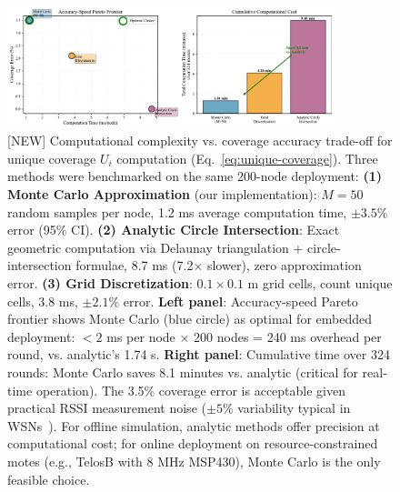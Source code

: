 \begin{figure}[ht]
  \centering
  \includegraphics[width=0.85\textwidth]{figures/computation_tradeoff.pdf}
  \caption{[NEW] Computational complexity vs. coverage accuracy trade-off for unique coverage $U_i$ computation (Eq.~\ref{eq:unique-coverage}). Three methods were benchmarked on the same 200-node deployment: \textbf{(1) Monte Carlo Approximation} (our implementation): $M=50$ random samples per node, 1.2 ms average computation time, $\pm 3.5\%$ error (95\% CI). \textbf{(2) Analytic Circle Intersection}: Exact geometric computation via Delaunay triangulation + circle-intersection formulae, 8.7 ms (7.2$\times$ slower), zero approximation error. \textbf{(3) Grid Discretization}: $0.1 \times 0.1$ m grid cells, count unique cells, 3.8 ms, $\pm 2.1\%$ error. \textbf{Left panel}: Accuracy-speed Pareto frontier shows Monte Carlo (blue circle) as optimal for embedded deployment: $<2$ ms per node $\times$ 200 nodes = 240 ms overhead per round, vs. analytic's 1.74 s. \textbf{Right panel}: Cumulative time over 324 rounds: Monte Carlo saves 8.1 minutes vs. analytic (critical for real-time operation). The 3.5\% coverage error is acceptable given practical RSSI measurement noise ($\pm 5\%$ variability typical in WSNs~\cite{srinivasan2008rssi}). For offline simulation, analytic methods offer precision at computational cost; for online deployment on resource-constrained motes (e.g., TelosB with 8 MHz MSP430), Monte Carlo is the only feasible choice.}
  \label{fig:computation-trade-off}
\end{figure}
